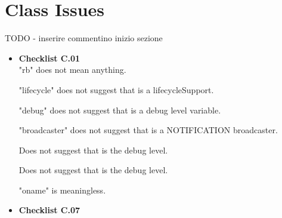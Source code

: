 \documentclass[../../../../codeInspection.tex]{subfiles}
\begin{document}
	\section{Class Issues}

		TODO - inserire commentino inizio sezione

		\begin{itemize}

			\item \textbf{Checklist C.01} \\

				  

				  "rb" does not mean anything.

				  

				  "lifecycle" does not suggest that is a lifecycleSupport.

				  

				  "debug" does not suggest that is a debug level variable.

				  

				  "broadcaster" does not suggest that is a NOTIFICATION broadcaster.

				  

				  Does not suggest that is the debug level.

				  

				  Does not suggest that is the debug level.

				  

				  "oname" is meaningless.

		    \item \textbf{Checklist C.07}

		    	  

		    	  


\end{itemize}
\end{document}
